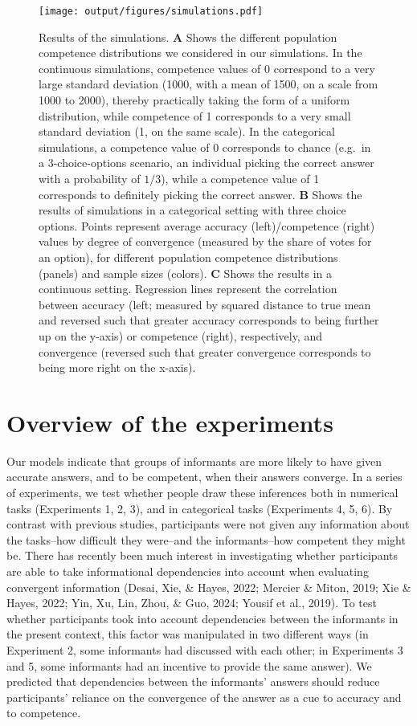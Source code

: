 \documentclass[
  doc,floatsintext]{apa6}
\begin{document}
\begin{figure}
\centering
\texttt{[image: output/figures/simulations.pdf]}
\caption{\label{fig:simulations}Results of the simulations. \textbf{A} Shows the different population competence distributions we considered in our simulations. In the continuous simulations, competence values of 0 correspond to a very large standard deviation (1000, with a mean of 1500, on a scale from 1000 to 2000), thereby practically taking the form of a uniform distribution, while competence of 1 corresponds to a very small standard deviation (1, on the same scale). In the categorical simulations, a competence value of 0 corresponds to chance (e.g.~in a 3-choice-options scenario, an individual picking the correct answer with a probability of \(1/3\)), while a competence value of 1 corresponds to definitely picking the correct answer. \textbf{B} Shows the results of simulations in a categorical setting with three choice options. Points represent average accuracy (left)/competence (right) values by degree of convergence (measured by the share of votes for an option), for different population competence distributions (panels) and sample sizes (colors). \textbf{C} Shows the results in a continuous setting. Regression lines represent the correlation between accuracy (left; measured by squared distance to true mean and reversed such that greater accuracy corresponds to being further up on the y-axis) or competence (right), respectively, and convergence (reversed such that greater convergence corresponds to being more right on the x-axis).}
\end{figure}

\section{Overview of the experiments}\label{overview-of-the-experiments}

Our models indicate that groups of informants are more likely to have given accurate answers, and to be competent, when their answers converge. In a series of experiments, we test whether people draw these inferences both in numerical tasks (Experiments 1, 2, 3), and in categorical tasks (Experiments 4, 5, 6). By contrast with previous studies, participants were not given any information about the tasks--how difficult they were--and the informants--how competent they might be. There has recently been much interest in investigating whether participants are able to take informational dependencies into account when evaluating convergent information (Desai, Xie, \& Hayes, 2022; Mercier \& Miton, 2019; Xie \& Hayes, 2022; Yin, Xu, Lin, Zhou, \& Guo, 2024; Yousif et al., 2019). To test whether participants took into account dependencies between the informants in the present context, this factor was manipulated in two different ways (in Experiment 2, some informants had discussed with each other; in Experiments 3 and 5, some informants had an incentive to provide the same answer). We predicted that dependencies between the informants' answers should reduce participants' reliance on the convergence of the answer as a cue to accuracy and to competence.
\end{document}
